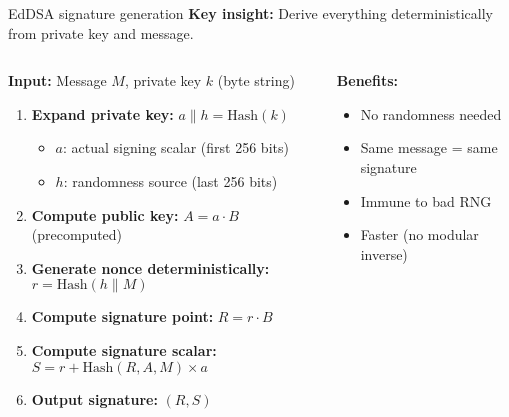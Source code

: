 \documentclass[aspectratio=169, lualatex, handout]{beamer}
\begin{document}
\begin{frame}{EdDSA signature generation}
	\textbf{Key insight:} Derive everything deterministically from private key and message.
	\begin{columns}
		\begin{column}{0.7\textwidth}
			\textbf{Input:} Message $M$, private key $k$ (byte string)
			\begin{enumerate}[<+->]
				\item \textbf{Expand private key:} $a \parallel h = \text{Hash}(k)$
				      \begin{itemize}
					      \item $a$: actual signing scalar (first 256 bits)
					      \item $h$: randomness source (last 256 bits)
				      \end{itemize}
				\item \textbf{Compute public key:} $A = a \cdot B$ (precomputed)
				\item \textbf{Generate nonce deterministically:} $r = \text{Hash}(h \parallel M)$
				\item \textbf{Compute signature point:} $R = r \cdot B$
				\item \textbf{Compute signature scalar:} $S = r + \text{Hash}(R, A, M) \times a$
				\item \textbf{Output signature:} $(R, S)$
			\end{enumerate}
		\end{column}
		\begin{column}{0.3\textwidth}
			\textbf{Benefits:}
			\begin{itemize}[<+->]
				\item No randomness needed
				\item Same message = same signature
				\item Immune to bad RNG
				\item Faster (no modular inverse)
			\end{itemize}
		\end{column}
	\end{columns}
\end{frame}
\end{document}
